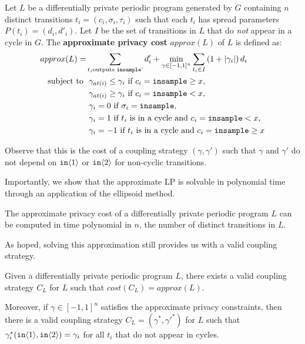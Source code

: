 \begin{defn}
    Let $L$ be a differentially private periodic program generated by $G$ containing $n$ distinct transitions $t_i = (c_i, \sigma_i, \tau_i)$ such that each $t_i$ has spread parameters $P(t_i) = (d_i, d'_i)$.
    Let $I$ be the set of transitions in $L$ that do \textit{not} appear in a cycle in $G$. The \textbf{approximate privacy cost} $approx(L)$ of $L$ is defined as:
    \begin{align*} 
        approx(L) = &\sum_{t_i \text{outputs \texttt{insample}'}} d_i' + \min_{\gamma \in [-1, 1]^n} \sum_{t_i \in I} \left(1 + |\gamma_i| \right) d_i  \\
            \text{subject to } 
            &\ \gamma_{at(i)} \leq \gamma_i \text{ if } c_i = \texttt{insample}\geq x, \\
            &\ \gamma_{at(i)} \geq \gamma_i \text{ if } c_i = \texttt{insample} < x, \\
            &\ \gamma_i = 0 \text{ if } \sigma_i = \texttt{insample}, \\
            &\ \gamma_i = 1 \text{ if } t_i \text{ is in a cycle and } c_i = \texttt{insample} < x,\\ 
            &\ \gamma_i = -1 \text{ if } t_i \text{ is in a cycle and } c_i = \texttt{insample}\geq x
    \end{align*}
\end{defn}
Observe that this is the cost of a coupling strategy $(\gamma, \gamma')$ such that $\gamma$ and $\gamma'$ do not depend on $\texttt{in}\langle1 \rangle$ or $\texttt{in}\langle2 \rangle$ for non-cyclic transitions. 

Importantly, we show that the approximate LP is solvable in polynomial time through an application of the ellipsoid method.

\begin{prop}\label{approximateSolutionPolyTimeProp}
    The approximate privacy cost of a differentially private periodic program $L$ can be computed in time polynomial in $n$, the number of distinct transitions in $L$.
\end{prop}

As hoped, solving this approximation still provides us with a valid coupling strategy.

\begin{prop}
    \label{prop:approx_exists}
    Given a differentially private periodic program $L$, there exists a valid coupling strategy $C_L$ for $L$ such that $cost(C_L) = approx(L)$.

    Moreover, if $\gamma \in [-1, 1]^n$ satisfies the approximate privacy constraints, then there is a valid coupling strategy $C_L = (\gamma^*, {\gamma'}^*)$ for $L$ such that $\gamma_i^*(\texttt{in}\langle1 \rangle, \texttt{in}\langle2 \rangle) = \gamma_i$ for all $t_i$ that do not appear in cycles. 
\end{prop}

